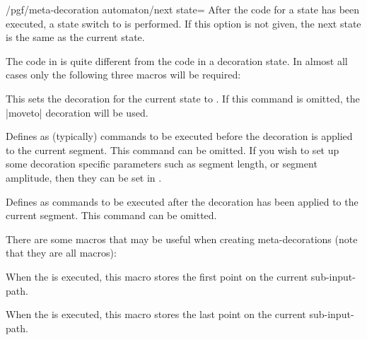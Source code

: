 \begin{command}{\pgfdeclaremetadecorate{}}
\begin{command}{\state{}}
        \begin{key}{/pgf/meta-decoration automaton/next state=}
            After the code for a state has been executed, a state switch to
             is performed. If this option is not given, the
            next state is the same as the current state.
        \end{key}

        The code in  is quite different from the code in a
        decoration state. In almost all cases only the following three macros
        will be required:

        \begin{command}{\decoration{}}
            This sets the decoration for the current state to . If
            this command is omitted, the |moveto| decoration will be used.
        \end{command}

        \begin{command}{\beforedecoration{}}
            Defines  as (typically) \pgfname{} commands to be
            executed before the decoration is applied to the current segment.
            This command can be omitted. If you wish to set up some decoration
            specific parameters such as segment length, or segment amplitude,
            then they can be set in .
        \end{command}

        \begin{command}{\afterdecoration{}}
            Defines  as commands to be executed after the
            decoration has been applied to the current segment. This command
            can be omitted.
        \end{command}

        There are some macros that may be useful when creating meta-decorations
        (note that they are all macros):

        \begin{command}{\pgfpointmetadecoratedpathfirst}
            When the  is executed, this macro stores the
            first point on the current sub-input-path.
        \end{command}

        \begin{command}{\pgfpointmetadecoratedpathlast}
            When the  is executed, this macro stores the last
            point on the current sub-input-path.
        \end{command}


\end{command}
\end{command}
